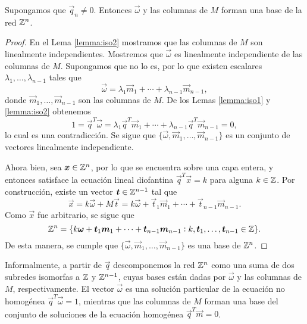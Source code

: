 \begin{theorem}
	\label{th:lattice}
	Supongamos que $\vec{q}_n \neq 0$. Entonces $\vec{\omega}$ y las columnas de $M$ forman una base
	de la red $\mathbb{Z}^n$.
\end{theorem}
\begin{proof}
	En el Lema \ref{lemma:iso2} mostramos que las columnas de $M$ son linealmente independientes.
	Mostremos que $\vec{\omega}$ es linealmente independiente de las columnas de $M$. Supongamos que
	no lo es, por lo que existen escalares $\lambda_1, \ldots, \lambda_{n-1}$ tales que
	\begin{equation*}
		\vec{\omega} = \lambda_1 \vec{m}_1 + \cdots + \lambda_{n-1} \vec{m}_{n-1},
	\end{equation*}
	donde $\vec{m}_1, \ldots, \vec{m}_{n-1}$ son las columnas de $M$. De los Lemas \ref{lemma:iso1}
	y \ref{lemma:iso2} obtenemos
	\begin{equation*}
		1 = \vec{q}^T\vec{\omega} = \lambda_1 \vec{q}^T\vec{m}_1 + \cdots + \lambda_{n-1}
		\vec{q}^T\vec{m}_{n-1} = 0,
	\end{equation*}
	lo cual es una contradicción. Se sigue que $\lbrace \vec{\omega}, \vec{m}_1, \ldots,
	\vec{m}_{n-1}\rbrace$ es un conjunto de vectores linealmente independiente.

	Ahora bien, sea $\boldsymbol{x} \in \mathbb{Z}^n$, por lo que se encuentra sobre una capa entera, y entonces
	satisface la ecuación lineal diofantina $\vec{q}^T\vec{x} = k$ para alguna $k \in \mathbb{Z}$. Por
	construcción, existe un vector $\boldsymbol{t} \in \mathbb{Z}^{n-1}$ tal que
	\begin{equation*}
		\vec{x} = k\vec{\omega} + M\vec{t} = k\vec{\omega} + \vec{t}_1\vec{m}_1 + \cdots +
		\vec{t}_{n-1}\vec{m}_{n-1}.
	\end{equation*}
	Como $\vec{x}$ fue arbitrario, se sigue que
	\begin{equation*}
		\mathbb{Z}^n = \lbrace
		k\boldsymbol{\omega} + \boldsymbol{t}_1\boldsymbol{m}_1 + \cdots + \boldsymbol{t}_{n-1}\boldsymbol{m}_{n-1}
		\vcentcolon k, \boldsymbol{t}_1, \ldots, \boldsymbol{t}_{n-1} \in \mathbb{Z}
		\rbrace.
	\end{equation*}
	De esta manera, se cumple que $\lbrace \vec{\omega}, \vec{m}_1, \ldots, \vec{m}_{n-1}\rbrace$ es
	una base de $\mathbb{Z}^n$.
\end{proof}

Informalmente, a partir de $\vec{q}$ descomponemos la red $\mathbb{Z}^n$ como una suma de dos subredes
isomorfas a $\mathbb{Z}$ y $\mathbb{Z}^{n-1}$, cuyas bases están dadas por $\vec{\omega}$ y las columnas de $M$,
respectivamente. El vector $\vec{\omega}$ es una solución particular de la ecuación no homogénea
$\vec{q}^T\vec{\omega} = 1$, mientras que las columnas de $M$ forman una base del conjunto de
soluciones de la ecuación homogénea $\vec{q}^T\vec{m} = 0$.


